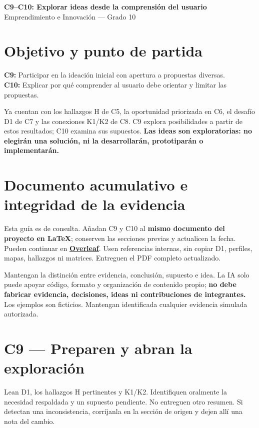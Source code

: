 \documentclass[12pt,a4paper]{article}
\newcommand{\guidelink}[2]{\href{#1}{\textcolor{LinkColor}{\textbf{\underline{#2}}}}}
\newcommand{\instruction}[1]{\textcolor{InstructionColor}{\textbf{#1}}}
\newcommand{\concept}[1]{\textcolor{ConceptColor}{\textbf{#1}}}
\begin{document}
\begin{center}
{\Large\bfseries\color{HeadingColor} C9--C10: Explorar ideas desde la comprensión del usuario}\\[3pt]
Emprendimiento e Innovación --- Grado 10
\end{center}

\section*{Objetivo y punto de partida}
\concept{C9:} Participar en la ideación inicial con apertura a propuestas diversas.\\
\concept{C10:} Explicar por qué comprender al usuario debe orientar y limitar las propuestas.

Ya cuentan con los hallazgos H de C5, la oportunidad priorizada en C6, el desafío D1 de C7 y las conexiones K1/K2 de C8. C9 explora posibilidades a partir de estos resultados; C10 examina sus supuestos. \instruction{Las ideas son exploratorias: no elegirán una solución, ni la desarrollarán, prototiparán o implementarán.}

\section*{Documento acumulativo e integridad de la evidencia}
Esta guía es de consulta. Añadan C9 y C10 al \textbf{mismo documento del proyecto en LaTeX}; conserven las secciones previas y actualicen la fecha. Pueden continuar en \guidelink{https://www.overleaf.com/}{Overleaf}. Usen referencias internas, sin copiar D1, perfiles, mapas, hallazgos ni matrices. Entreguen el PDF completo actualizado.

Mantengan la distinción entre evidencia, conclusión, supuesto e idea. La IA solo puede apoyar código, formato y organización de contenido propio; \instruction{no debe fabricar evidencia, decisiones, ideas ni contribuciones de integrantes.} Los ejemplos son ficticios. Mantengan identificada cualquier evidencia simulada autorizada.

\section*{C9 --- Preparen y abran la exploración}
Lean D1, los hallazgos H pertinentes y K1/K2. Identifiquen oralmente la necesidad respaldada y un supuesto pendiente. No entreguen otro resumen. Si detectan una inconsistencia, corríjanla en la sección de origen y dejen allí una nota del cambio.
\end{document}
